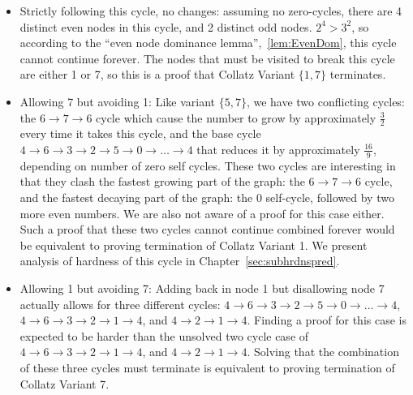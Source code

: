 \begin{itemize}
    \begin{itemize}
        \item Strictly following this cycle, no changes: assuming no zero-cycles, there are 4 distinct even nodes in this cycle, and 2 distinct odd nodes. $2^4 > 3^2$, so according to the ``even node dominance lemma'',~\ref{lem:EvenDom}, this cycle cannot continue forever. The nodes that must be visited to break this cycle are either 1 or 7, so this is a proof that Collatz Variant $\{1,7\}$ terminates.
        \item Allowing 7 but avoiding 1: Like variant $\{5,7\}$, we have two conflicting cycles: the $6 \rightarrow 7 \rightarrow 6$ cycle which cause the number to grow by approximately $\frac{3}{2}$ every time it takes this cycle, and the base cycle $4 \rightarrow 6 \rightarrow 3 \rightarrow 2 \rightarrow 5 \rightarrow 0 \rightarrow \ldots \rightarrow 4$ that reduces it by approximately $\frac{16}{9}$, depending on number of zero self cycles. These two cycles are interesting in that they clash the fastest growing part of the graph: the $6 \rightarrow 7 \rightarrow 6$ cycle, and the fastest decaying part of the graph: the 0 self-cycle, followed by two more even numbers. We are also not aware of a proof for this case either. Such a proof that these two cycles cannot continue combined forever would be equivalent to proving termination of Collatz Variant 1. We present analysis of hardness of this cycle in Chapter~\ref{sec:subhrdnspred}.
        \item Allowing 1 but avoiding 7: Adding back in node 1 but disallowing node 7 actually allows for three different cycles: $4 \rightarrow 6 \rightarrow 3 \rightarrow 2 \rightarrow 5 \rightarrow 0 \rightarrow \ldots \rightarrow 4$, $4 \rightarrow 6 \rightarrow 3 \rightarrow 2 \rightarrow 1 \rightarrow 4$, and $4 \rightarrow 2 \rightarrow 1 \rightarrow 4$.  Finding a proof for this case is expected to be harder than the unsolved two cycle case of $4 \rightarrow 6 \rightarrow 3 \rightarrow 2 \rightarrow 1 \rightarrow 4$, and $4 \rightarrow 2 \rightarrow 1 \rightarrow 4$. Solving that the combination of these three cycles must terminate is equivalent to proving termination of Collatz Variant 7.
    \end{itemize}
\end{itemize}
